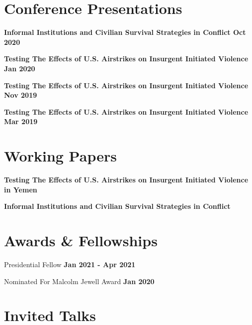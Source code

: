 \documentclass[margin]{res}
\newcommand{\fullhrulefill}{%
  \hspace*{-\sectionwidth}\hrulefill%
  }
\begin{document}
\begin{resume}
\fullhrulefill
\section {Conference Presentations}


\textbf {Informal Institutions and Civilian Survival Strategies in Conflict \hfill{Oct 2020}  \\ }

\textbf {Testing The Effects of U.S. Airstrikes on Insurgent Initiated Violence \hfill{Jan 2020}  \\ }

\textbf {Testing The Effects of U.S. Airstrikes on Insurgent Initiated Violence \hfill{Nov 2019}  \\ }

\textbf {Testing The Effects of U.S. Airstrikes on Insurgent Initiated Violence \hfill{Mar 2019} \\ }

\fullhrulefill
\section{Working Papers}
\textbf {Testing The Effects of U.S. Airstrikes on Insurgent Initiated Violence in Yemen}

\textbf {Informal Institutions and Civilian Survival Strategies in Conflict}


\newpage
\fullhrulefill

\section{Awards \& Fellowships}
Presidential Fellow \hfill{\textbf{Jan 2021 - Apr 2021 }} \\  

Nominated For Malcolm Jewell Award \hfill{\textbf{Jan 2020}} \\



\fullhrulefill

\section{Invited Talks}


\end{resume}
\end{document}

